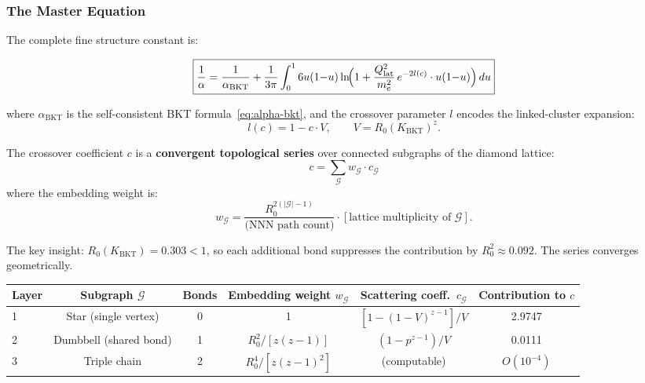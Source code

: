 \documentclass[aps,prd,onecolumn,superscriptaddress,floatfix,12pt]{revtex4-2}
\newcommand{\Rzero}{R_0}
\newcommand{\KBKT}{K_{\text{BKT}}}
\newcommand{\Qlat}{Q_{\text{lat}}}
\newcommand{\alphaBKT}{\alpha_{\text{BKT}}}
\begin{document}
\subsubsection{The Master Equation}

The complete fine structure constant is:
\begin{widetext}
\begin{equation}\label{eq:master}
\boxed{\frac{1}{\alpha} = \frac{1}{\alphaBKT} + \frac{1}{3\pi}\int_0^1 6u(1{-}u)\ln\!\Bigl(1 + \frac{\Qlat^2}{m_e^2}\,e^{-2l(c)} \cdot u(1{-}u)\Bigr)\,du}
\end{equation}
\end{widetext}
where $\alphaBKT$ is the self-consistent BKT formula~\eqref{eq:alpha-bkt}, and the crossover parameter $l$ encodes the linked-cluster expansion:
\begin{equation}\label{eq:crossover}
l(c) = 1 - c \cdot V, \qquad V = \Rzero(\KBKT)^z.
\end{equation}

The crossover coefficient $c$ is a \textbf{convergent topological series} over connected subgraphs of the diamond lattice:
\begin{equation}\label{eq:lce-series}
c = \sum_{\mathcal{G}} w_{\mathcal{G}} \cdot c_{\mathcal{G}}
\end{equation}
where the embedding weight is:
\begin{equation}
w_{\mathcal{G}} = \frac{\Rzero^{2(|\mathcal{G}| - 1)}}{\text{(NNN path count)}} \cdot [\text{lattice multiplicity of } \mathcal{G}].
\end{equation}

The key insight: $\Rzero(\KBKT) = 0.303 < 1$, so each additional bond suppresses the contribution by $\Rzero^2 \approx 0.092$. The series converges geometrically.

\begin{table}[t]
\begin{tabular}{lccccc}
\toprule
Layer & Subgraph $\mathcal{G}$ & Bonds & Embedding weight $w_{\mathcal{G}}$ & Scattering coeff.\ $c_{\mathcal{G}}$ & Contribution to $c$ \\
\midrule
1 & Star (single vertex) & 0 & 1 & $[1-(1{-}V)^{z-1}]/V$ & 2.9747 \\
2 & Dumbbell (shared bond) & 1 & $\Rzero^2/[z(z{-}1)]$ & $(1-p^{z-1})/V$ & 0.0111 \\
3 & Triple chain & 2 & $\Rzero^4/[z(z{-}1)^2]$ & (computable) & $O(10^{-4})$ \\
\bottomrule
\end{tabular}
\end{table}
\end{document}
